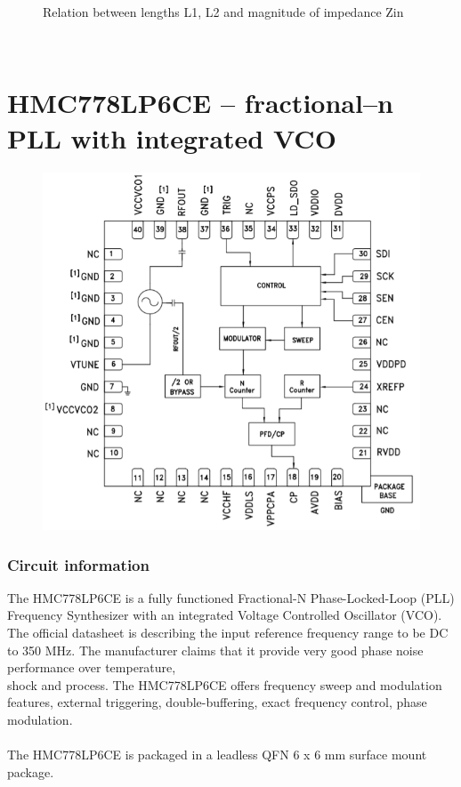 \documentclass[a4paper, 11pt]{report}
\begin{document}
\begin{figure}[!h]
	\caption{Relation between lengths L1, L2 and magnitude of impedance Zin}
	\label{fig:figure1}
\end{figure}
\\

\newpage

\section{HMC778LP6CE -- fractional--n PLL with integrated VCO}
\begin{figure}[!h]
	\centering
	\includegraphics[width=0.3\linewidth]{pll}
	\label{fig:pll}
\end{figure}
\noindent
\subsubsection{Circuit information}
The HMC778LP6CE is a fully functioned Fractional-N Phase-Locked-Loop (PLL) Frequency Synthesizer with an
integrated Voltage Controlled Oscillator (VCO). \\
The official datasheet is describing the input reference frequency range to be DC to 350 MHz. The manufacturer claims that it provide very good phase noise performance over temperature,\\
shock and process. The HMC778LP6CE offers frequency sweep and modulation features, external
triggering, double-buffering, exact frequency control, phase modulation.\\ \\ The HMC778LP6CE is packaged
in a leadless QFN 6 x 6 mm surface mount package.
\end{document}
